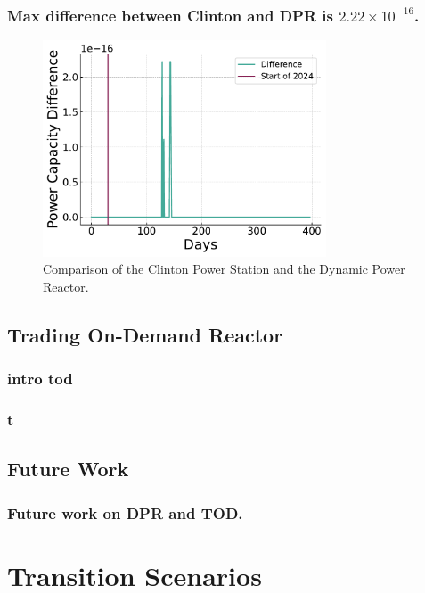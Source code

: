 \documentclass[9pt]{beamer}
\begin{document}
\begin{frame}
  \frametitle{Max difference between Clinton and DPR is $2.22 \times 10^{-16}$.}
  \begin{figure}
    \centering
    \includegraphics[width=0.75\textwidth]{images/dpr_diff.pdf}
    \caption{Comparison of the Clinton Power Station and the Dynamic Power Reactor.}
  \end{figure}
\end{frame}


\subsection{Trading On-Demand Reactor}
\begin{frame}
  \frametitle{intro tod}
\end{frame}

\begin{frame}
  \frametitle{t}
\end{frame}

\subsection{Future Work}
\begin{frame}
  \frametitle{Future work on DPR and TOD.}
\end{frame}

\section{Transition Scenarios}
\end{document}
